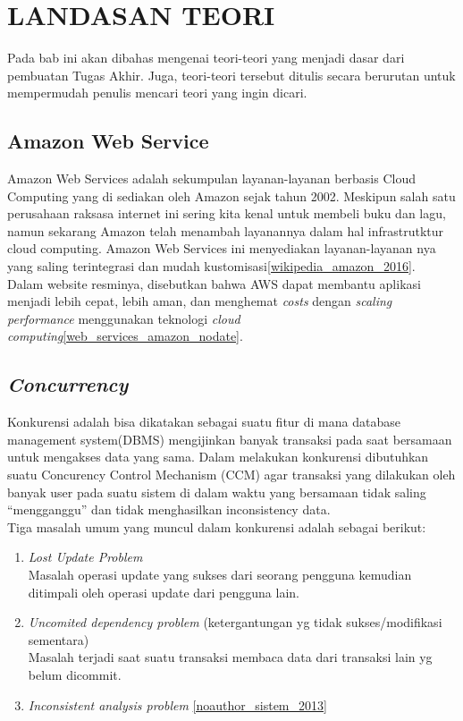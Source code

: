 	\chapter{LANDASAN TEORI}
	Pada bab ini akan dibahas mengenai teori-teori yang menjadi dasar dari pembuatan Tugas Akhir. Juga, teori-teori tersebut ditulis secara berurutan untuk mempermudah penulis mencari teori yang ingin dicari.
	
	\section{Amazon Web Service}
	Amazon Web Services adalah sekumpulan layanan-layanan berbasis Cloud Computing yang di sediakan oleh Amazon sejak tahun 2002. Meskipun salah satu perusahaan raksasa internet ini sering kita kenal untuk membeli buku dan lagu, namun sekarang Amazon telah menambah layanannya dalam hal infrastrutktur cloud computing. Amazon Web Services ini menyediakan layanan-layanan nya yang saling terintegrasi dan mudah kustomisasi\ref{wikipedia_amazon_2016}.
	\\ \indent
	Dalam website resminya, disebutkan bahwa AWS dapat membantu aplikasi menjadi lebih cepat, lebih aman, dan menghemat \textit{costs} dengan \textit{scaling} \textit{performance} menggunakan teknologi \textit{cloud computing}\ref{web_services_amazon_nodate}.
	
	\section{\textit{Concurrency}}
	Konkurensi adalah bisa dikatakan sebagai suatu fitur di mana database management system(DBMS) mengijinkan banyak transaksi pada saat bersamaan untuk mengakses data yang sama. Dalam melakukan konkurensi dibutuhkan suatu Concurency Control Mechanism (CCM) agar transaksi yang dilakukan oleh banyak user pada suatu sistem di dalam waktu yang bersamaan tidak saling “mengganggu” dan tidak menghasilkan inconsistency data.
	\\ \indent
	Tiga masalah umum yang muncul dalam konkurensi adalah sebagai berikut: 
	\begin{enumerate}
	    	\item \textit{Lost Update Problem }\\ \indent Masalah operasi update yang sukses dari seorang pengguna kemudian ditimpali oleh operasi update dari pengguna lain.
	    	\item\textit{ Uncomited dependency problem } (ketergantungan yg tidak sukses/modifikasi sementara) \\ \indent
	    	Masalah terjadi saat suatu transaksi membaca data dari transaksi lain yg belum dicommit.
	    	\item \textit{Inconsistent analysis problem} \ref{noauthor_sistem_2013}
	\end{enumerate}   
	
